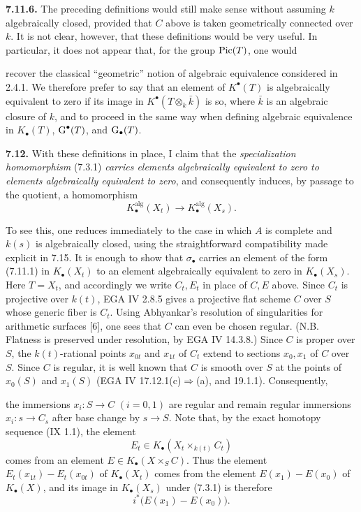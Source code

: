 \textbf{7.11.6.}
The preceding definitions would still make sense without assuming $k$
algebraically closed, provided that $C$ above is taken geometrically
connected over $k$. It is not clear, however, that these definitions would
be very useful. In particular, it does not appear that, for the group
$\operatorname{Pic}(T)$, one would

recover the classical ``geometric'' notion of algebraic equivalence
considered in 2.4.1. We therefore prefer to say that an element of
$K^\bullet(T)$ is algebraically equivalent to zero if its image in
$K^\bullet(T\otimes_k\bar k)$ is so, where $\bar k$ is an algebraic closure
of $k$, and to proceed in the same way when defining algebraic equivalence
in $K_\bullet(T)$, $\operatorname{G}^\bullet(T)$, and $\operatorname{G}_\bullet(T)$.

\textbf{7.12.}
With these definitions in place, I claim that the \emph{specialization homomorphism}
(7.3.1)
\emph{carries elements algebraically equivalent to zero to elements
algebraically equivalent to zero}, and consequently induces, by passage to
the quotient, a homomorphism
\begin{equation}\tag{7.12.1}
K_\bullet^{\mathrm{alg}}(X_t)
\longrightarrow K_\bullet^{\mathrm{alg}}(X_s).
\end{equation}

To see this, one reduces immediately to the case in which $A$ is complete
and $k(s)$ is algebraically closed, using the straightforward compatibility
made explicit in 7.15. It is enough to show that $\sigma_\bullet$ carries an
element of the form (7.11.1) in $K_\bullet(X_t)$ to an element algebraically
equivalent to zero in $K_\bullet(X_s)$. Here $T=X_t$, and accordingly we
write $C_t,E_t$ in place of $C,E$ above. Since $C_t$ is projective over
$k(t)$, EGA IV 2.8.5 gives a projective flat scheme $C$ over $S$ whose
generic fiber is $C_t$. Using Abhyankar's resolution of singularities for
arithmetic surfaces [6], one sees that $C$ can even be chosen regular.
(N.B. Flatness is preserved under resolution, by EGA IV 14.3.8.) Since $C$ is
proper over $S$, the $k(t)$-rational points $x_{0t}$ and $x_{1t}$ of $C_t$
extend to sections $x_0,x_1$ of $C$ over $S$. Since $C$ is regular, it is
well known that $C$ is smooth over $S$ at the points of $x_0(S)$ and
$x_1(S)$ (EGA IV 17.12.1(c)$\Rightarrow$(a), and 19.1.1). Consequently,

the immersions $x_i:S\to C$ $(i=0,1)$ are regular and remain regular
immersions $x_i:s\to C_s$ after base change by $s\to S$. Note that, by the
exact homotopy sequence (IX 1.1), the element
\[
E_t\in K_\bullet(X_t\times_{k(t)}C_t)
\]
comes from an element $E\in K_\bullet(X\times_SC)$. Thus the element
$E_t(x_{1t})-E_t(x_{0t})$ of $K_\bullet(X_t)$ comes from the element
$E(x_1)-E(x_0)$ of $K_\bullet(X)$, and its image in $K_\bullet(X_s)$ under
(7.3.1) is therefore
\[
i^*\bigl(E(x_1)-E(x_0)\bigr).
\tag{*}
\]

